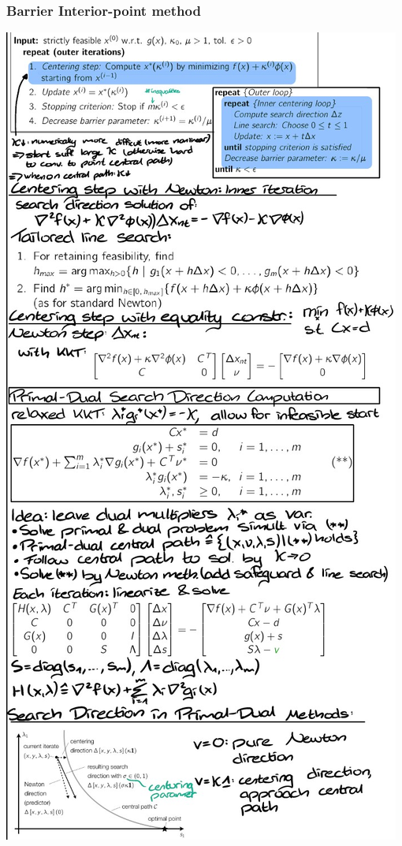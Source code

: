 \subsubsection{Barrier Interior-point method}
\includegraphics[width= 0.99\linewidth]{MPC_summary/Images/mag_num.jpg}